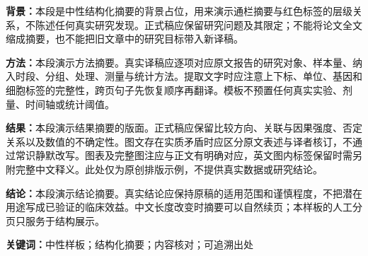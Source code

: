 \documentclass[UTF8,fontset=none,scheme=plain]{ctexart}
\newcommand{\ResearchPart}[2]{\noindent\textbf{\color{AhaHeading}#1：}#2\par\vspace{7bp}}
\begin{document}
\sffamily\normalsize
{}
\thispagestyle{ahafirst}
\ResearchPart{背景}{本段是中性结构化摘要的背景占位，用来演示通栏摘要与红色标签的层级关系，不陈述任何真实研究发现。正式稿应保留研究问题及其限定；不能将论文全文缩成摘要，也不能把旧文章中的研究目标带入新译稿。}
\ResearchPart{方法}{本段演示方法摘要。真实译稿应逐项对应原文报告的研究对象、样本量、纳入时段、分组、处理、测量与统计方法。提取文字时应注意上下标、单位、基因和细胞标签的完整性，跨页句子先恢复顺序再翻译。模板不预置任何真实实验、剂量、时间轴或统计阈值。}
\ResearchPart{结果}{本段演示结果摘要的版面。正式稿应保留比较方向、关联与因果强度、否定关系以及数值的不确定性。图文存在实质矛盾时应区分原文表述与译者核订，不通过常识静默改写。图表及完整图注应与正文有明确对应，英文图内标签保留时需另附完整中文释义。此处仅为原创排版示例，不提供真实数据或研究结论。}
\ResearchPart{结论}{本段演示结论摘要。真实结论应保持原稿的适用范围和谨慎程度，不把潜在用途写成已验证的临床效益。中文长度改变时摘要可以自然续页；本样板的人工分页只服务于结构展示。}
\begin{center}{\fontsize{8bp}{10bp}\selectfont\textbf{\color{AhaHeading}关键词：}中性样板；结构化摘要；内容核对；可追溯出处}\end{center}
\vfill\AhaOpeningNotes
\end{document}

